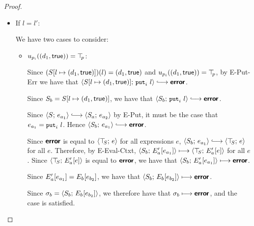 \begin{proof}
\begin{enumerate}
\begin{enumerate}
\begin{itemize}
        \item If $l = l'$:

          We have two cases to consider:

          \begin{itemize}
            \item $u_{p_i}((d_1, \textsf{true})) = \top\hspace{-0.85mm}_{p}$:


              Since $(S[l \mapsto (d_1, \textsf{true})])(l) =
              (d_1, \textsf{true})$ and
              $u_{p_i}((d_1, \textsf{true})) = \top\hspace{-0.85mm}_{p}$, by {\sc
                E-Put-Err} we have that
              $\config{\extSRaw{S}{l}{\state{d_1}{\frozentrue}}}{\putiexp{l}}
              \parstepsto \error$.

              Since $S_b = S[l \mapsto (d_1, \textsf{true})]$,
              we have that $\config{S_b}{\putiexp{l}} \parstepsto
              \error$.

              Since $\config{S}{e_{a_1}} \parstepsto
              \config{S_a}{e_{a_2}}$ by {\sc E-Put}, it must be the
              case that $e_{a_1} = \mbox{\small{\texttt{put}}}_i~l$.  Hence
              $\config{S_b}{e_{a_1}} \parstepsto \error$.

              Since $\textbf{\textsf{error}}$ is equal to $\langle \top\hspace{-0.85mm}_{S};\, e \rangle$ for all
              expressions $e$, $\config{S_b}{e_{a_1}} \parstepsto
              \config{\topS}{e}$ for all $e$.  Therefore, by {\sc
                E-Eval-Ctxt}, $\langle S_b;\, E'_a\hspace{-0.5mm}\left[e_{a_1}\right] \rangle
              \longmapsto \langle \top\hspace{-0.85mm}_{S};\, E'_a\hspace{-0.5mm}\left[e\right] \rangle$ for all
              $e$.  Since $\langle \top\hspace{-0.85mm}_{S};\, E'_a\hspace{-0.5mm}\left[e\right] \rangle$ is
              equal to $\textbf{\textsf{error}}$, we have that
              $\langle S_b;\, E'_a\hspace{-0.5mm}\left[e_{a_1}\right] \rangle \longmapsto
              \textbf{\textsf{error}}$.

              Since $E'_a\hspace{-0.5mm}\left[e_{a_1}\right] =
              E_b\hspace{-0.5mm}\left[e_{b_2}\right]$, we have that
              $\langle S_b;\, E_b\hspace{-0.5mm}\left[e_{b_2}\right] \rangle \longmapsto
              \textbf{\textsf{error}}$.

              Since $\sigma_b = \langle S_b;\, E_b\hspace{-0.5mm}\left[e_{b_2}\right] \rangle$,
              we therefore have that $\sigma_b \longmapsto \textbf{\textsf{error}}$, and
              the case is satisfied.


\end{itemize}
\end{itemize}
\end{enumerate}
\end{enumerate}
\end{proof}

